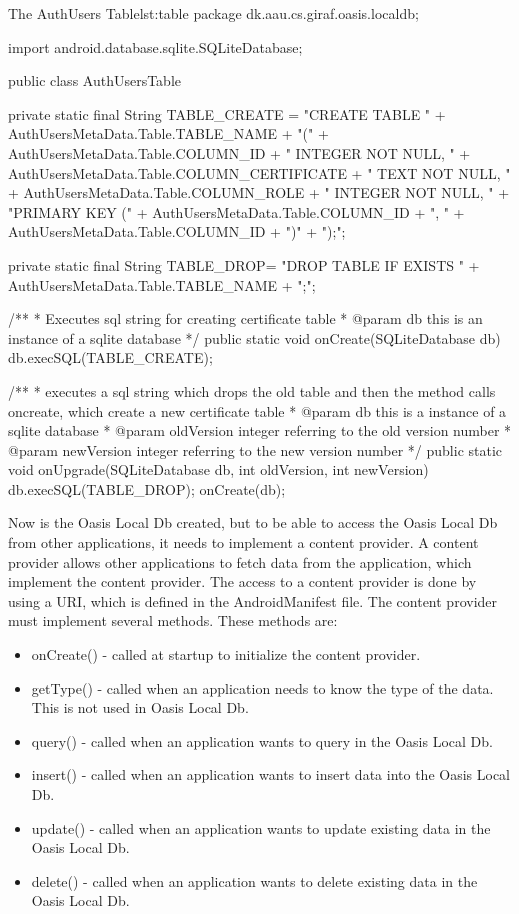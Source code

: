 \begin{Java}{The AuthUsers Table}{lst:table}
package dk.aau.cs.giraf.oasis.localdb;

import android.database.sqlite.SQLiteDatabase;

public class AuthUsersTable {

	private static final String TABLE_CREATE = "CREATE TABLE "
			+ AuthUsersMetaData.Table.TABLE_NAME
			+ "("
			+ AuthUsersMetaData.Table.COLUMN_ID + " INTEGER NOT NULL, "
			+ AuthUsersMetaData.Table.COLUMN_CERTIFICATE + " TEXT NOT NULL, "
			+ AuthUsersMetaData.Table.COLUMN_ROLE + " INTEGER NOT NULL, "
			+ "PRIMARY KEY (" + AuthUsersMetaData.Table.COLUMN_ID + ", " + AuthUsersMetaData.Table.COLUMN_ID + ")"
			+ ");";

	private static final String TABLE_DROP= "DROP TABLE IF EXISTS " + AuthUsersMetaData.Table.TABLE_NAME + ";";

	/**
	 * Executes sql string for creating certificate table
	 * @param db this is an instance of a sqlite database
	 */
	public static void onCreate(SQLiteDatabase db) {
		db.execSQL(TABLE_CREATE);
	}

	/**
	 * executes a sql string which drops the old table and then the method calls oncreate, which create a new certificate table
	 * @param db this is a instance of a sqlite database
	 * @param oldVersion integer referring to the old version number
	 * @param newVersion integer referring to the new version number
	 */
	public static void onUpgrade(SQLiteDatabase db, int oldVersion, int newVersion) {
		db.execSQL(TABLE_DROP);
		onCreate(db);
	}
}
\end{Java}

Now is the Oasis Local Db created, but to be able to access the Oasis Local Db from other applications, it needs to implement a content provider. A content provider allows other applications to fetch data from the application, which implement the content provider. The access to a content provider is done by using a URI, which is defined in the AndroidManifest file. The content provider must implement several methods. These methods are:

\begin{itemize}
	\item onCreate() - called at startup to initialize the content provider.
	\item getType() - called when an application needs to know the type of the data. This is not used in Oasis Local Db.
	\item query() - called when an application wants to query in the Oasis Local Db.
	\item insert() - called when an application wants to insert data into the Oasis Local Db.
	\item update() - called when an application wants to update existing data in the Oasis Local Db.
	\item delete() - called when an application wants to delete existing data in the Oasis Local Db.
\end{itemize}

